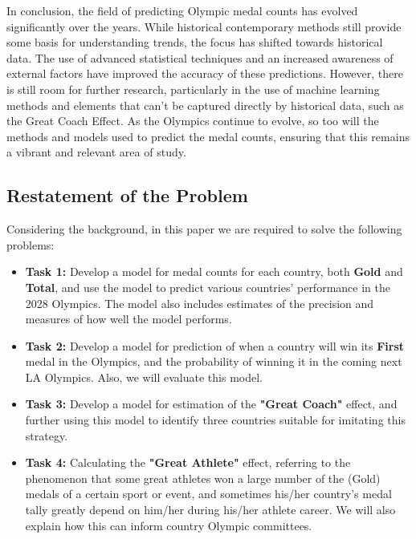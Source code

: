 In conclusion, the field of predicting Olympic medal counts has evolved significantly over the years. While historical contemporary methods still provide some basis for understanding trends, the focus has shifted towards historical data. The use of advanced statistical techniques and an increased awareness of external factors have improved the accuracy of these predictions\cite{4}. 
However, there is still room for further research, particularly in the use of machine learning methods and elements that can't be captured directly by historical data, such as the Great Coach Effect\cite{2}. As the Olympics continue to evolve, so too will the methods and models used to predict the medal counts, ensuring that this remains a vibrant and relevant area of study.\cite{anderson2015review,clark2012modeling}

\subsection{Restatement of the Problem}
Considering the background, in this paper we are required to solve the following problems:

\begin{itemize}
\item{\bf Task 1:} Develop a model for medal counts for each country, both \textbf{Gold} and \textbf{Total}, and use the model to predict various countries' performance in the 2028 Olympics. The model also includes estimates of the precision and measures of how well the model performs.

\item{\bf Task 2:} Develop a model for prediction of when a country will win its \textbf{First} medal in the Olympics, and the probability of winning it in the coming next LA Olympics. Also, we will evaluate this model.

\item{\bf Task 3:} Develop a model for estimation of the \textbf{"Great Coach"} effect, and further using this model to identify three countries suitable for imitating this strategy.

\item{\bf Task 4:} Calculating the \textbf{"Great Athlete"} effect, referring to the phenomenon that some great athletes won a large number of the (Gold) medals of a certain sport or event, and sometimes his/her country's medal tally greatly depend on him/her during his/her athlete career. We will also explain how this can inform country Olympic committees.
\end{itemize}

